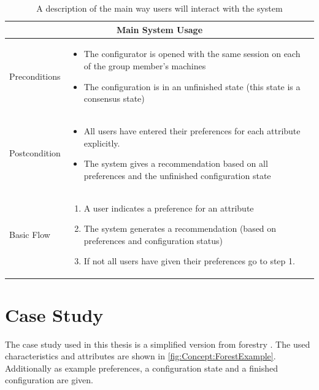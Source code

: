 \begin{table}
    \begin{center}
        \begin{tabularx}{\columnwidth}{l|X}
            \multicolumn{2}{c}{Main System Usage} \\
            \hline
            Preconditions   & 
                \begin{itemize}
                    \item The configurator is opened with the same session on each of the group member's machines
                    \item The configuration is in an unfinished state (this state is a consensus state)
                \end{itemize} \\
            \hline
            Postcondition   & 
                \begin{itemize}
                    \item All users have entered their preferences for each attribute explicitly.
                    \item The system gives a recommendation based on all preferences and the unfinished configuration state
                \end{itemize} \\
            \hline
            Basic Flow      & 
                \begin{enumerate}
                    \item A user indicates a preference for an attribute
                    \item The system generates a recommendation (based on preferences and configuration status)
                    \item If not all users have given their preferences go to step 1.
                \end{enumerate} \\
            \hline
        \end{tabularx}
        \caption{A description of the main way users will interact with the system}
        \label{tab:Concept:MainUseCase}
    \end{center}
\end{table}

\section{Case Study}
\label{sec:Concept:CaseStudy}

The case study used in this thesis is a simplified version from forestry .
The used characteristics and attributes are shown in \autoref{fig:Concept:ForestExample}. Additionally as example preferences, a configuration state and a finished configuration are given.

